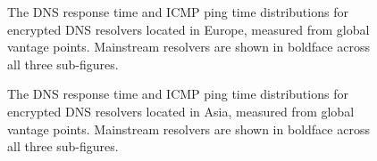 \begin{figure}[t!]
    \caption{The DNS response time and ICMP ping time distributions for
    encrypted DNS resolvers located in Europe, measured from global vantage points.
    Mainstream resolvers are shown in boldface across all three
    sub-figures.}
\label{fig:dns-europe}
\end{figure}


\begin{figure}[t!]
\hfill%
%
\hfill%
%
\hfill%
%
    \caption{The DNS response time and ICMP ping time distributions for
    encrypted DNS resolvers located in Asia, measured from global vantage points.
    Mainstream resolvers are shown in boldface across all three
    sub-figures.}
\label{fig:dns-asia}
\end{figure}
